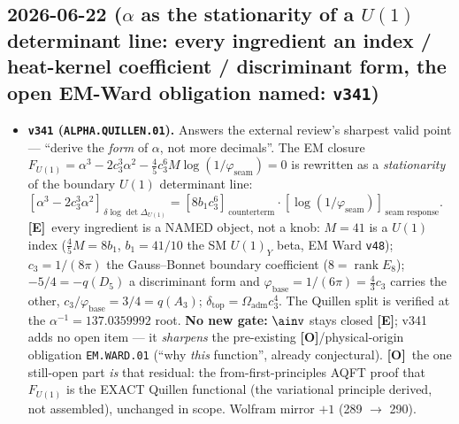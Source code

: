 \documentclass[11pt]{article}
\providecommand{\mE}{\textbf{[E]}}\providecommand{\mC}{\textbf{[C]}}
\providecommand{\mO}{\textbf{[O]}}\providecommand{\mX}{\textbf{[X]}}
\providecommand{\vref}[1]{\texttt{#1}}
\providecommand{\cthree}{c_3}\providecommand{\phiz}{\varphi_0^{\mathrm{ret}}}
\begin{document}
\subsection*{2026-06-22 ($\alpha$ as the stationarity of a $U(1)$ determinant line: every ingredient an index / heat-kernel coefficient / discriminant form, the open EM-Ward obligation named: \texttt{v341})}
\begin{itemize}
\item \textbf{\texttt{v341} (\texttt{ALPHA.QUILLEN.01}).} Answers the external review's sharpest valid point ---
``derive the \emph{form} of $\alpha$, not more decimals''. The EM closure
$F_{U(1)}=\alpha^3-2\cthree^3\alpha^2-\tfrac45\cthree^6 M\log(1/\varphi_{\mathrm{seam}})=0$ is rewritten as a
\emph{stationarity} of the boundary $U(1)$ determinant line:
$[\alpha^3-2\cthree^3\alpha^2]_{\,\delta\log\det\Delta_{U(1)}}=[8b_1\cthree^6]_{\,\text{counterterm}}\cdot
[\log(1/\varphi_{\mathrm{seam}})]_{\,\text{seam response}}$. \mE\ every ingredient is a NAMED object, not a knob:
$M{=}41$ is a $U(1)$ index ($\tfrac45 M=8b_1$, $b_1{=}41/10$ the SM $U(1)_Y$ beta, EM Ward \vref{v48});
$\cthree{=}1/(8\pi)$ the Gauss--Bonnet boundary coefficient ($8{=}\operatorname{rank}E_8$); $-5/4=-q(D_5)$ a
discriminant form and $\varphi_{\mathrm{base}}{=}1/(6\pi){=}\tfrac43\cthree$ carries the other,
$\cthree/\varphi_{\mathrm{base}}{=}3/4{=}q(A_3)$; $\delta_{\mathrm{top}}{=}\Omega_{\mathrm{adm}}\cthree^4$. The
Quillen split is verified at the $\alpha^{-1}{=}137.0359992$ root. \textbf{No new gate:} $\ainv$ stays closed
\mE; v341 adds no open item --- it \emph{sharpens} the pre-existing \mO/physical-origin obligation
\texttt{EM.WARD.01} (``why \emph{this} function'', already conjectural). \mO\ the one still-open part \emph{is} that
residual: the from-first-principles AQFT proof that $F_{U(1)}$ is the EXACT Quillen functional (the variational
principle derived, not assembled), unchanged in scope. Wolfram mirror $+1$ (289 $\to$ 290).
\end{itemize}
\end{document}
